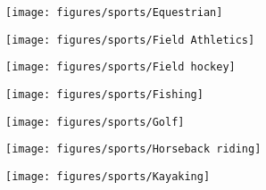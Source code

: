 \documentclass[11pt]{article}
\begin{document}
     \clearpage

     \begin{figure}[htb!]
         \centering

         \begin{subfigure}{.5\textwidth}
             \centering
             \texttt{[image: figures/sports/Equestrian]}
         \end{subfigure}%
         \hfill
         \begin{subfigure}{.5\textwidth}
             \centering
             \texttt{[image: figures/sports/Field Athletics]}
         \end{subfigure}%
         \hfill
         \begin{subfigure}{.5\textwidth}
             \centering
             \texttt{[image: figures/sports/Field hockey]}
         \end{subfigure}%
         \hfill
         \begin{subfigure}{.5\textwidth}
             \centering
             \texttt{[image: figures/sports/Fishing]}
         \end{subfigure}%
         \hfill
         \begin{subfigure}{.5\textwidth}
             \centering
             \texttt{[image: figures/sports/Golf]}
         \end{subfigure}%
         \hfill
         \begin{subfigure}{.5\textwidth}
             \centering
             \texttt{[image: figures/sports/Horseback riding]}
         \end{subfigure}%
         \hfill
         \begin{subfigure}{.5\textwidth}
             \centering
             \texttt{[image: figures/sports/Kayaking]}
         \end{subfigure}%
         \hfill
     \end{figure}

     \clearpage
\end{document}
